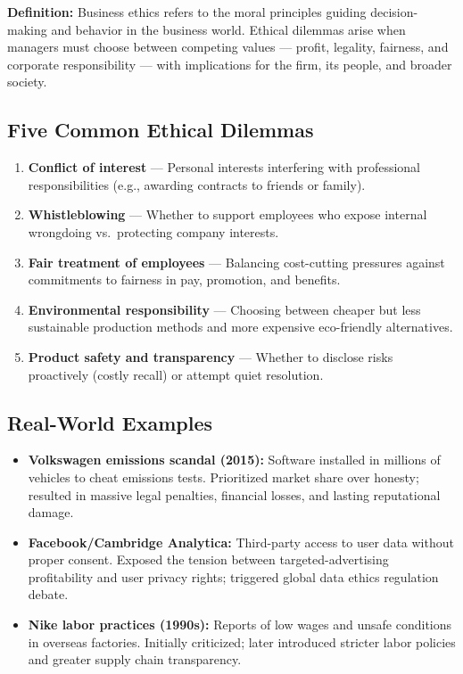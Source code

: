 \documentclass[11pt, letterpaper]{article}
\begin{document}
\begin{defbox}
\textbf{Definition:} Business ethics refers to the moral principles guiding decision-making and behavior in the business world. Ethical dilemmas arise when managers must choose between competing values --- profit, legality, fairness, and corporate responsibility --- with implications for the firm, its people, and broader society.
\end{defbox}

\subsection{Five Common Ethical Dilemmas}

\begin{enumerate}[leftmargin=*, label=\textbf{\arabic*.}]
  \item \textbf{Conflict of interest} --- Personal interests interfering with professional responsibilities (e.g., awarding contracts to friends or family).
  \item \textbf{Whistleblowing} --- Whether to support employees who expose internal wrongdoing vs.\ protecting company interests.
  \item \textbf{Fair treatment of employees} --- Balancing cost-cutting pressures against commitments to fairness in pay, promotion, and benefits.
  \item \textbf{Environmental responsibility} --- Choosing between cheaper but less sustainable production methods and more expensive eco-friendly alternatives.
  \item \textbf{Product safety and transparency} --- Whether to disclose risks proactively (costly recall) or attempt quiet resolution.
\end{enumerate}

\subsection{Real-World Examples}

\begin{itemize}[leftmargin=*]
  \item \textbf{Volkswagen emissions scandal (2015):} Software installed in millions of vehicles to cheat emissions tests. Prioritized market share over honesty; resulted in massive legal penalties, financial losses, and lasting reputational damage.
  \item \textbf{Facebook/Cambridge Analytica:} Third-party access to user data without proper consent. Exposed the tension between targeted-advertising profitability and user privacy rights; triggered global data ethics regulation debate.
  \item \textbf{Nike labor practices (1990s):} Reports of low wages and unsafe conditions in overseas factories. Initially criticized; later introduced stricter labor policies and greater supply chain transparency.
\end{itemize}
\end{document}
